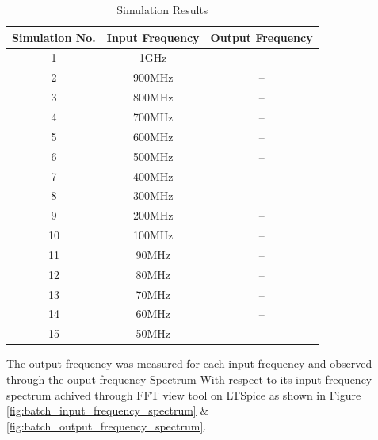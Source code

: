 \begin{table}[H]
    \centering
    \begin{tabular}{|c|c|c|}
        \hline 
        \textbf{Simulation No.} & \textbf{Input Frequency} & \textbf{Output Frequency} \\
        \hline
        1 & 1GHz & --\\
        2 & 900MHz & --\\
        3 & 800MHz & --\\
        4 & 700MHz & --\\
        5 & 600MHz & --\\
        6 & 500MHz & --\\
        7 & 400MHz & --\\
        8 & 300MHz & --\\
        9 & 200MHz & --\\
        10 & 100MHz & --\\
        11 & 90MHz & --\\
        12 & 80MHz & --\\
        13 & 70MHz & --\\
        14 & 60MHz & --\\
        15 & 50MHz & --\\
        \hline
    \end{tabular}
    \caption{Simulation Results}
    \label{tab:simulation_results}
\end{table}
The output frequency was measured for each input frequency and observed through the ouput frequency Spectrum With respect to its input frequency spectrum achived through FFT view tool on LTSpice as shown in Figure \ref{fig:batch_input_frequency_spectrum} \& \ref{fig:batch_output_frequency_spectrum}.


